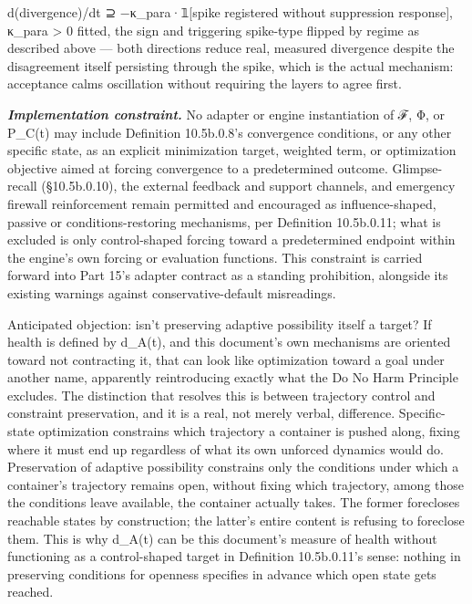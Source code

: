 \documentclass[
]{article}
\begin{document}
d(divergence)/dt ⊇ −κ\_para·𝟙{[}spike registered without suppression
response{]}, κ\_para \textgreater{} 0 fitted, the sign and triggering
spike-type flipped by regime as described above --- both directions
reduce real, measured divergence despite the disagreement itself
persisting through the spike, which is the actual mechanism: acceptance
calms oscillation without requiring the layers to agree first.

\emph{\textbf{Implementation constraint.}} No adapter or engine
instantiation of ℱ, Φ, or P\_C(t) may include Definition 10.5b.0.8's
convergence conditions, or any other specific state, as an explicit
minimization target, weighted term, or optimization objective aimed at
forcing convergence to a predetermined outcome. Glimpse-recall
(§10.5b.0.10), the external feedback and support channels, and emergency
firewall reinforcement remain permitted and encouraged as
influence-shaped, passive or conditions-restoring mechanisms, per
Definition 10.5b.0.11; what is excluded is only control-shaped forcing
toward a predetermined endpoint within the engine's own forcing or
evaluation functions. This constraint is carried forward into Part 15's
adapter contract as a standing prohibition, alongside its existing
warnings against conservative-default misreadings.

Anticipated objection: isn't preserving adaptive possibility itself a
target? If health is defined by d\_A(t), and this document's own
mechanisms are oriented toward not contracting it, that can look like
optimization toward a goal under another name, apparently reintroducing
exactly what the Do No Harm Principle excludes. The distinction that
resolves this is between trajectory control and constraint preservation,
and it is a real, not merely verbal, difference. Specific-state
optimization constrains which trajectory a container is pushed along,
fixing where it must end up regardless of what its own unforced dynamics
would do. Preservation of adaptive possibility constrains only the
conditions under which a container's trajectory remains open, without
fixing which trajectory, among those the conditions leave available, the
container actually takes. The former forecloses reachable states by
construction; the latter's entire content is refusing to foreclose them.
This is why d\_A(t) can be this document's measure of health without
functioning as a control-shaped target in Definition 10.5b.0.11's sense:
nothing in preserving conditions for openness specifies in advance which
open state gets reached.
\end{document}
